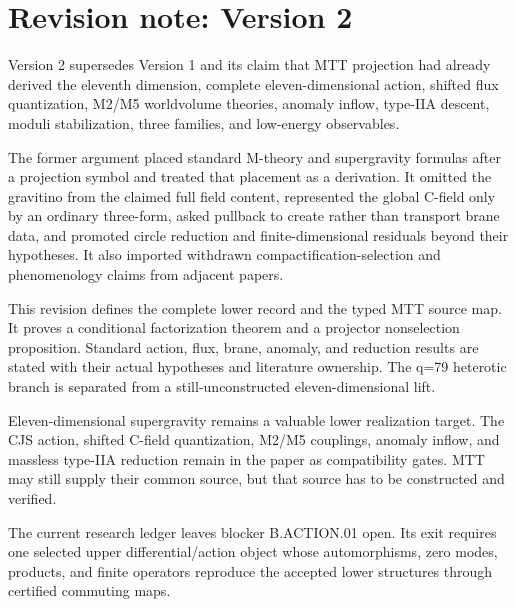 \documentclass[11pt]{article}
\theoremstyle{definition}
\theoremstyle{remark}
\begin{document}
\section*{Revision note: Version 2}
\begin{description}[leftmargin=2.5cm,style=nextline]
\item[Supersedes]
Version 2 supersedes Version 1 and its claim that MTT projection had already
derived the eleventh dimension, complete eleven-dimensional action, shifted
flux quantization, M2/M5 worldvolume theories, anomaly inflow, type-IIA
descent, moduli stabilization, three families, and low-energy observables.

\item[Reason]
The former argument placed standard M-theory and supergravity formulas after
a projection symbol and treated that placement as a derivation.  It omitted
the gravitino from the claimed full field content, represented the global
C-field only by an ordinary three-form, asked pullback to create rather than
transport brane data, and promoted circle reduction and finite-dimensional
residuals beyond their hypotheses.  It also imported withdrawn
compactification-selection and phenomenology claims from adjacent papers.

\item[Resolution]
This revision defines the complete lower record and the typed MTT source map.
It proves a conditional factorization theorem and a projector nonselection
proposition.  Standard action, flux, brane, anomaly, and reduction results are
stated with their actual hypotheses and literature ownership.  The q=79
heterotic branch is separated from a still-unconstructed eleven-dimensional
lift.

\item[Retained content]
Eleven-dimensional supergravity remains a valuable lower realization target.
The CJS action, shifted C-field quantization, M2/M5 couplings, anomaly inflow,
and massless type-IIA reduction remain in the paper as compatibility gates.
MTT may still supply their common source, but that source has to be
constructed and verified.

\item[Remaining boundary]
The current research ledger leaves blocker B.ACTION.01 open.  Its exit
requires one selected upper differential/action object whose automorphisms,
zero modes, products, and finite operators reproduce the accepted lower
structures through certified commuting maps.
\end{description}
\end{document}
